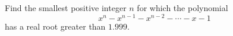 Find the smallest positive integer $n$ for which the polynomial \[x^n-x^{n-1}-x^{n-2}-\cdots -x-1\] has a real root greater than $1.999$.
